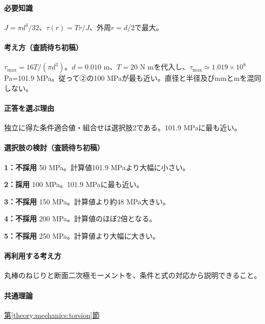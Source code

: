 \paragraph{必要知識} \(J=\pi d^4/32\)、\(\tau(r)=Tr/J\)、外周\(r=d/2\)で最大。

\paragraph{考え方（査読待ち初稿）} \(\tau_{\max}=16T/(\pi d^3)\)。\(d=0.010\) m、\(T=20\) N mを代入し、\(\tau_{\max}\simeq1.019\times10^8\) Pa=\allowbreak{}101.9 MPa。従って②の100 MPaが最も近い。直径と半径及びmmとmを混同しない。

\paragraph{正答を選ぶ理由} 独立に得た条件適合値・組合せは選択肢2である。101.9 MPaに最も近い。

\paragraph{選択肢の検討（査読待ち初稿）}\mbox{}\par

\noindent\textbf{1：不採用} 50 MPa。計算値101.9 MPaより大幅に小さい。\par

\noindent\textbf{2：採用} 100 MPa。101.9 MPaに最も近い。\par

\noindent\textbf{3：不採用} 150 MPa。計算値より約48 MPa大きい。\par

\noindent\textbf{4：不採用} 200 MPa。計算値のほぼ2倍となる。\par

\noindent\textbf{5：不採用} 250 MPa。計算値より大幅に大きい。\par

\paragraph{再利用する考え方} 丸棒のねじりと断面二次極モーメントを、条件と式の対応から説明できること。

\paragraph{共通理論} \hyperref[theory:mechanics:torsion]{第\ref*{theory:mechanics:torsion}節}

